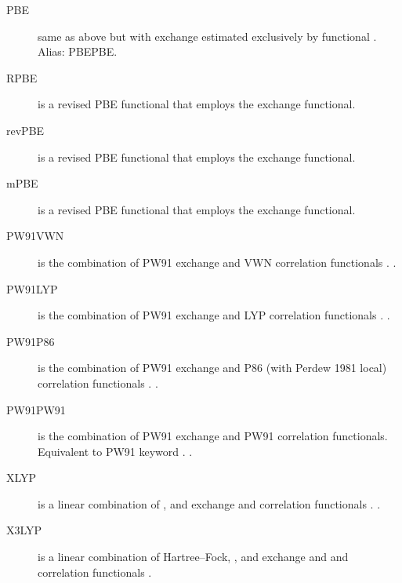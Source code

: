 \begin{description}
\item[PBE] same as above but with exchange estimated exclusively by
   functional \cite{dft:pbe}. Alias: PBEPBE. 

\item[RPBE] is a revised PBE functional that employs the 
   exchange functional.

\item[revPBE] is a revised PBE functional that employs the 
   exchange functional.

\item[mPBE] is a revised PBE functional that employs the 
   exchange functional.

\item[PW91VWN] is the combination of PW91 exchange and VWN correlation functionals 
   \cite{dft:pw91,dft:vwn}.
  .

\item[PW91LYP] is the combination of PW91 exchange and LYP correlation functionals 
   \cite{dft:pw91,dft:lyp1,dft:lyp2}.
  .

\item[PW91P86] is the combination of PW91 exchange and P86 (with Perdew 1981 local) 
  correlation functionals \cite{dft:pw91,dft:pw86,dft:pz81}.
  .

\item[PW91PW91] is the combination of PW91 exchange and PW91 correlation functionals. 
  Equivalent to PW91 keyword \cite{dft:pw91}.
  .

\item[XLYP] is a linear combination of ,  and 
  exchange and  correlation functionals \cite{dft:xlyp,dft:x3lyp}.
  .

\item[X3LYP] is a linear combination of Hartree--Fock, ,  
  and  exchange and  and  correlation functionals 
  \cite{dft:xlyp,dft:x3lyp}.

\end{description}



